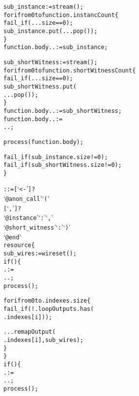\begin{alltt}
    sub_instance := stream();
    for i from 0 to function.instancCount \{
      fail_if(...size == 0);
      sub_instance.put(...pop());
    \}
    function.body.. := sub_instance;
    
    sub_shortWitness := stream();
    for i from 0 to function.shortWitnessCount \{
      fail_if(...size == 0);
      sub_shortWitness.put(
        ...pop());
    \}
    function.body.. := sub_shortWitness;
    function.body.. :=
      ..;

    process(function.body);

    fail_if(sub_instance.size != 0);
    fail_if(sub_shortWitness.size != 0);
  \}\ttSyn

   ::= [  `<-' ]?
                              `@anon_call' `('
                              [  `,' ]?
                              `@instance' `:'  `,'
                              `@short_witness' `:'  `)'
                              `@end'\ttSem
  resource \{
    sub_wires := wireset();
    if() \{
      . :=
        ..;
      process();

      for i from 0 to .indexes.size \{
        fail_if(!.loopOutputs.has(
          .indexes[i]));

        ...remapOutput(
          .indexes[i], sub_wires);
      \}
    \}
    if() \{
      . :=
        ..;
      process();


\end{alltt}
